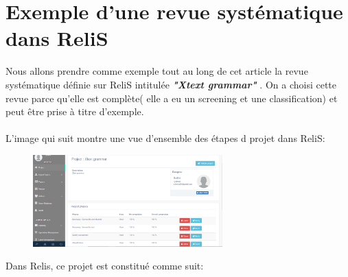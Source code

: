 \newpage

\section{Exemple d'une revue systématique dans ReliS}

Nous allons prendre comme exemple tout au long de cet article la revue systématique définie sur ReliS intitulée \textit{\textbf{"Xtext grammar"}} \footnotemark[1]. On a choisi cette revue parce qu'elle est complète( elle a eu un screening et une classification) et peut être prise à titre d'exemple. \\ \\

L'image qui suit montre une vue d'ensemble des étapes d projet dans ReliS:
\begin{figure}[H]
        \centering
        \includegraphics[width=0.65\textwidth]{resources/images/Xtext grammar.PNG}
    \end{figure}

Dans Relis, ce projet est constitué comme suit:

